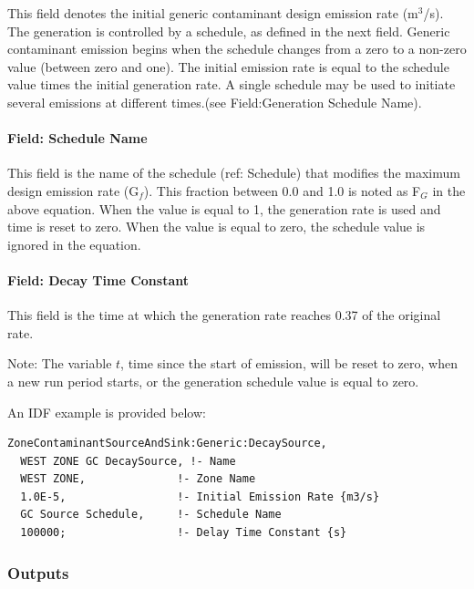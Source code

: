 This field denotes the initial generic contaminant design emission rate (m\(^{3}\)/s). The generation is controlled by a schedule, as defined in the next field. Generic contaminant emission begins when the schedule changes from a zero to a non-zero value (between zero and one). The initial emission rate is equal to the schedule value times the initial generation rate. A single schedule may be used to initiate several emissions at different times.(see Field:Generation Schedule Name).

\paragraph{Field: Schedule Name}\label{field-schedule-name-7}

This field is the name of the schedule (ref: Schedule) that modifies the maximum design emission rate (G\(_{f}\)). This fraction between 0.0 and 1.0 is noted as F\(_{G}\) in the above equation. When the value is equal to 1, the generation rate is used and time is reset to zero. When the value is equal to zero, the schedule value is ignored in the equation.

\paragraph{Field: Decay Time Constant}\label{field-decay-time-constant}

This field is the time at which the generation rate reaches 0.37 of the original rate.

\begin{callout}
  Note: The variable \(t\), time since the start of emission, will be reset to zero, when a new run period starts, or the generation schedule value is equal to zero.
\end{callout}

An IDF example is provided below:

\begin{lstlisting}
ZoneContaminantSourceAndSink:Generic:DecaySource,
  WEST ZONE GC DecaySource, !- Name
  WEST ZONE,              !- Zone Name
  1.0E-5,                 !- Initial Emission Rate {m3/s}
  GC Source Schedule,     !- Schedule Name
  100000;                 !- Delay Time Constant {s}
\end{lstlisting}

\subsubsection{Outputs}\label{outputs-10-003}

